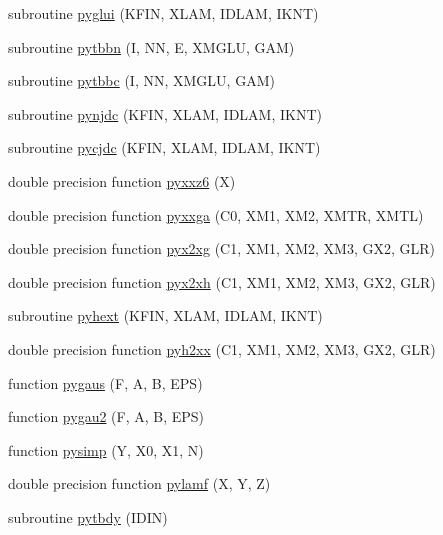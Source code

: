 \begin{DoxyCompactItemize}
subroutine \hyperlink{pythia-6_84_824_8f_a0e8de9275c7066b56e9cc2704eda4d9b}{pyglui} (K\+F\+I\+N, X\+L\+A\+M, I\+D\+L\+A\+M, I\+K\+N\+T)
\item 
subroutine \hyperlink{pythia-6_84_824_8f_a590e74787b29c2abd5a46aa6489d5219}{pytbbn} (I, N\+N, E, X\+M\+G\+L\+U, G\+A\+M)
\item 
subroutine \hyperlink{pythia-6_84_824_8f_afc82dd2989aea861fb20cd99499075ed}{pytbbc} (I, N\+N, X\+M\+G\+L\+U, G\+A\+M)
\item 
subroutine \hyperlink{pythia-6_84_824_8f_a4eb734124cd851ea27210387798a8ad9}{pynjdc} (K\+F\+I\+N, X\+L\+A\+M, I\+D\+L\+A\+M, I\+K\+N\+T)
\item 
subroutine \hyperlink{pythia-6_84_824_8f_ad5dbd98640d6b5751ae21c8467d25142}{pycjdc} (K\+F\+I\+N, X\+L\+A\+M, I\+D\+L\+A\+M, I\+K\+N\+T)
\item 
double precision function \hyperlink{pythia-6_84_824_8f_ad3802fc93d4a590b18e75cf9ffc0c04c}{pyxxz6} (X)
\item 
double precision function \hyperlink{pythia-6_84_824_8f_aa378166597fcb20d89584665eaf754c5}{pyxxga} (C0, X\+M1, X\+M2, X\+M\+T\+R, X\+M\+T\+L)
\item 
double precision function \hyperlink{pythia-6_84_824_8f_a628cca4ef6ca74365a47cbb6aec90a5f}{pyx2xg} (C1, X\+M1, X\+M2, X\+M3, G\+X2, G\+L\+R)
\item 
double precision function \hyperlink{pythia-6_84_824_8f_a172c02bb050da4b11542b15cb94e94f2}{pyx2xh} (C1, X\+M1, X\+M2, X\+M3, G\+X2, G\+L\+R)
\item 
subroutine \hyperlink{pythia-6_84_824_8f_a22a3f7a152bcf344f26ebfe59ee78151}{pyhext} (K\+F\+I\+N, X\+L\+A\+M, I\+D\+L\+A\+M, I\+K\+N\+T)
\item 
double precision function \hyperlink{pythia-6_84_824_8f_a77dc3ade154146159f6da8352bc4edf6}{pyh2xx} (C1, X\+M1, X\+M2, X\+M3, G\+X2, G\+L\+R)
\item 
function \hyperlink{pythia-6_84_824_8f_a54737ed1fa8203d34f6b7e41f8edaf45}{pygaus} (F, A, B, E\+P\+S)
\item 
function \hyperlink{pythia-6_84_824_8f_ad2bff8fc5a17d91922af88f41b6e22f3}{pygau2} (F, A, B, E\+P\+S)
\item 
function \hyperlink{pythia-6_84_824_8f_a743f71aa398768156c651708fff83733}{pysimp} (Y, X0, X1, N)
\item 
double precision function \hyperlink{pythia-6_84_824_8f_a9a5e0b1d8e92be18ecc53d89aba71c09}{pylamf} (X, Y, Z)
\item 
subroutine \hyperlink{pythia-6_84_824_8f_a89821a60f56d9d359eb0d345f14611f4}{pytbdy} (I\+D\+I\+N)

\end{DoxyCompactItemize}
